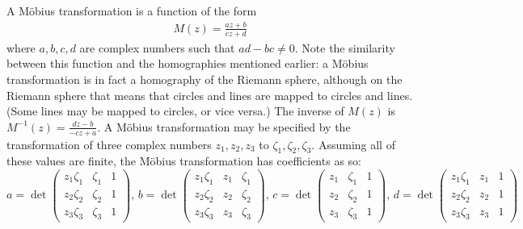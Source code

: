 \documentclass{amsart}[12pt]
\begin{document}
A M\"obius transformation is a function of the form
\begin{equation}\begin{split}
  M(z) = \frac{az+b}{cz+d}
\end{split}\end{equation}
where $a, b, c, d$ are complex numbers such that $ad - bc \ne 0$. Note the
similarity between this function and the homographies mentioned earlier: a
M\"obius transformation is in fact a homography of the Riemann sphere,
although on the Riemann sphere that means that circles and lines are mapped to
circles and lines. (Some lines may be mapped to circles, or vice versa.) The inverse of $M(z)$ is $M^{-1}(z) = \frac{dz-b}{-cz+a}$. A M\"obius transformation may be specified by the transformation of three complex numbers $z_1, z_2, z_3$ to $\zeta_1, \zeta_2, \zeta_3$. Assuming all of these values are finite, the M\"obius transformation has coefficients as so:
\begin{equation}a=\det \begin{pmatrix} z_1\zeta_1 & \zeta_1 & 1 \\
    z_2\zeta_2 & \zeta_2 & 1 \\   z_3\zeta_3 & \zeta_3 & 1 \end{pmatrix},\,
  b=\det \begin{pmatrix} z_1\zeta_1 & z_1 & \zeta_1 \\
    z_2\zeta_2 & z_2 & \zeta_2 \\   z_3\zeta_3 & z_3 & \zeta_3 \end{pmatrix},\,
  c=\det \begin{pmatrix} z_1 & \zeta_1 & 1 \\   z_2 & \zeta_2 & 1 \\
    z_3 & \zeta_3 & 1 \end{pmatrix},\,
  d=\det \begin{pmatrix} z_1\zeta_1 & z_1 & 1 \\
    z_2\zeta_2 & z_2 & 1 \\   z_3\zeta_3 & z_3 & 1 \end{pmatrix}
\end{equation}
\end{document}
